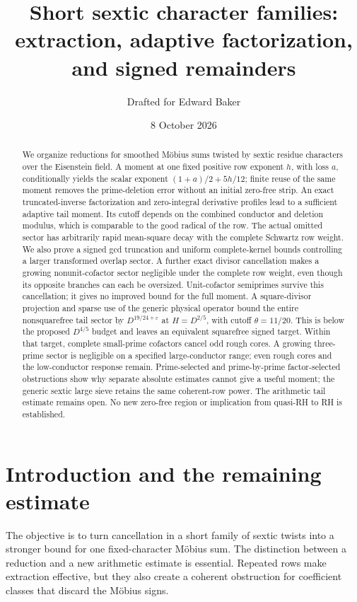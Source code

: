 \documentclass[11pt]{article}
\title{Short sextic character families:\\
 extraction, adaptive factorization, and signed remainders}
\author{Drafted for Edward Baker}
\date{8 October 2026}
\numberwithin{equation}{section}
\theoremstyle{definition}
\theoremstyle{remark}
\begin{document}
\maketitle
\begin{abstract}
We organize reductions for smoothed M\"obius sums twisted by sextic
residue characters over the Eisenstein field. A moment at one fixed
positive row exponent \(h\), with loss \(a\), conditionally yields the
scalar exponent \((1+a)/2+5h/12\); finite reuse of the same moment
removes the prime-deletion error without an initial zero-free strip.
An exact truncated-inverse factorization and zero-integral derivative
profiles lead to a sufficient adaptive tail moment. Its cutoff depends
on the combined conductor and deletion modulus, which is comparable
to the good radical of the row. The actual omitted sector has
arbitrarily rapid mean-square decay with the complete Schwartz row
weight. We also prove a signed gcd truncation and uniform complete-kernel
bounds controlling a larger transformed overlap sector.
A further exact divisor cancellation makes a growing nonunit-cofactor
sector negligible under the complete row weight, even though its opposite
branches can each be oversized. Unit-cofactor semiprimes survive this
cancellation; it gives no improved bound for the full moment.
A square-divisor projection and sparse use of the generic physical
operator bound the entire nonsquarefree tail sector by
\(D^{19/24+\varepsilon}\) at \(H=D^{2/5}\), with cutoff
\(\theta=11/20\). This is below the proposed \(D^{4/5}\) budget
and leaves an equivalent squarefree signed target.
Within that target, complete small-prime cofactors cancel odd rough cores.
A growing three-prime sector is negligible on a specified large-conductor
range; even rough cores and the low-conductor response remain.
Prime-selected and prime-by-prime factor-selected obstructions show
why separate absolute estimates cannot give a useful moment;
the generic sextic large sieve retains the same coherent-row power.
The arithmetic tail estimate remains open. No new zero-free region
or implication from quasi-RH to RH is established.
\end{abstract}
\tableofcontents

\section{Introduction and the remaining estimate}\label{sec:intro}

The objective is to turn cancellation in a short family of sextic
twists into a stronger bound for one fixed-character M\"obius sum.
The distinction between a reduction and a new arithmetic estimate is
essential. Repeated rows make extraction effective, but they also
create a coherent obstruction for coefficient classes that discard
the M\"obius signs.
\end{document}
